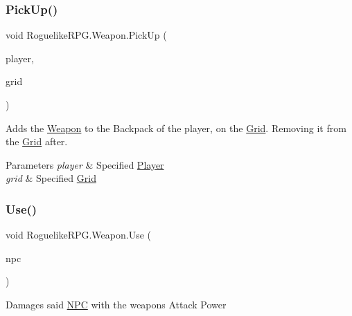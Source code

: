 \subsubsection{\texorpdfstring{Pick\+Up()}{PickUp()}}
{\footnotesize\ttfamily void Roguelike\+R\+P\+G.\+Weapon.\+Pick\+Up (\begin{DoxyParamCaption}\item[{\mbox{\hyperlink{class_roguelike_r_p_g_1_1_player}{Player}}}]{player,  }\item[{\mbox{\hyperlink{class_roguelike_r_p_g_1_1_grid}{Grid}}}]{grid }\end{DoxyParamCaption})\hspace{0.3cm}{\ttfamily [inline]}}



Adds the \mbox{\hyperlink{class_roguelike_r_p_g_1_1_weapon}{Weapon}} to the Backpack of the player, on the \mbox{\hyperlink{class_roguelike_r_p_g_1_1_grid}{Grid}}. Removing it from the \mbox{\hyperlink{class_roguelike_r_p_g_1_1_grid}{Grid}} after. 


\begin{DoxyParams}{Parameters}
{\em player} & Specified \mbox{\hyperlink{class_roguelike_r_p_g_1_1_player}{Player}}\\
\hline
{\em grid} & Specified \mbox{\hyperlink{class_roguelike_r_p_g_1_1_grid}{Grid}}\\
\hline
\end{DoxyParams}
\mbox{\label{class_roguelike_r_p_g_1_1_weapon_abc7ba430a40dc00c52d2ae10a1005eeb}} 
\subsubsection{\texorpdfstring{Use()}{Use()}}
{\footnotesize\ttfamily void Roguelike\+R\+P\+G.\+Weapon.\+Use (\begin{DoxyParamCaption}\item[{\mbox{\hyperlink{class_roguelike_r_p_g_1_1_n_p_c}{N\+PC}}}]{npc }\end{DoxyParamCaption})\hspace{0.3cm}{\ttfamily [inline]}}



Damages said \mbox{\hyperlink{class_roguelike_r_p_g_1_1_n_p_c}{N\+PC}} with the weapon\textquotesingle{}s Attack Power 


